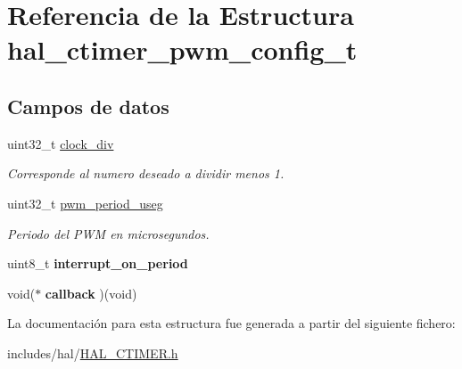 \hypertarget{structhal__ctimer__pwm__config__t}{}\section{Referencia de la Estructura hal\+\_\+ctimer\+\_\+pwm\+\_\+config\+\_\+t}
\label{structhal__ctimer__pwm__config__t}
\subsection*{Campos de datos}
\begin{DoxyCompactItemize}
\item 
\mbox{\label{structhal__ctimer__pwm__config__t_adba76882bdceba1a0d87c31457c5e491}} 
uint32\+\_\+t \hyperlink{structhal__ctimer__pwm__config__t_adba76882bdceba1a0d87c31457c5e491}{clock\+\_\+div}
\begin{DoxyCompactList}\small\item\em Corresponde al numero deseado a dividir menos 1. \end{DoxyCompactList}\item 
\mbox{\label{structhal__ctimer__pwm__config__t_ac208333db31433db820ea04fed5ea63a}} 
uint32\+\_\+t \hyperlink{structhal__ctimer__pwm__config__t_ac208333db31433db820ea04fed5ea63a}{pwm\+\_\+period\+\_\+useg}
\begin{DoxyCompactList}\small\item\em Periodo del P\+WM en microsegundos. \end{DoxyCompactList}\item 
\mbox{\label{structhal__ctimer__pwm__config__t_abb1db380e8fc4f8a65b1ab58e110cf87}} 
uint8\+\_\+t {\bfseries interrupt\+\_\+on\+\_\+period}
\item 
\mbox{\label{structhal__ctimer__pwm__config__t_afac344718d726350142e8393ff71b351}} 
void($\ast$ {\bfseries callback} )(void)
\end{DoxyCompactItemize}


La documentación para esta estructura fue generada a partir del siguiente fichero\+:\begin{DoxyCompactItemize}
\item 
includes/hal/\hyperlink{HAL__CTIMER_8h}{H\+A\+L\+\_\+\+C\+T\+I\+M\+E\+R.\+h}\end{DoxyCompactItemize}
